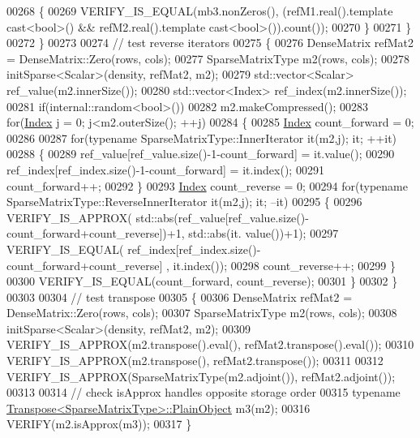 \begin{DoxyCode}
00268       \{
00269         VERIFY\_IS\_EQUAL(mb3.nonZeros(), (refM1.real().template cast<bool>() && refM2.real().template 
      cast<bool>()).count());
00270       \}
00271     \}
00272   \}
00273 
00274   \textcolor{comment}{// test reverse iterators}
00275   \{
00276     DenseMatrix refMat2 = DenseMatrix::Zero(rows, cols);
00277     SparseMatrixType m2(rows, cols);
00278     initSparse<Scalar>(density, refMat2, m2);
00279     std::vector<Scalar> ref\_value(m2.innerSize());
00280     std::vector<Index> ref\_index(m2.innerSize());
00281     \textcolor{keywordflow}{if}(internal::random<bool>())
00282       m2.makeCompressed();
00283     \textcolor{keywordflow}{for}(\hyperlink{namespace_eigen_a62e77e0933482dafde8fe197d9a2cfde}{Index} j = 0; j<m2.outerSize(); ++j)
00284     \{
00285       \hyperlink{namespace_eigen_a62e77e0933482dafde8fe197d9a2cfde}{Index} count\_forward = 0;
00286 
00287       \textcolor{keywordflow}{for}(\textcolor{keyword}{typename} SparseMatrixType::InnerIterator it(m2,j); it; ++it)
00288       \{
00289         ref\_value[ref\_value.size()-1-count\_forward] = it.value();
00290         ref\_index[ref\_index.size()-1-count\_forward] = it.index();
00291         count\_forward++;
00292       \}
00293       \hyperlink{namespace_eigen_a62e77e0933482dafde8fe197d9a2cfde}{Index} count\_reverse = 0;
00294       \textcolor{keywordflow}{for}(\textcolor{keyword}{typename} SparseMatrixType::ReverseInnerIterator it(m2,j); it; --it)
00295       \{
00296         VERIFY\_IS\_APPROX( std::abs(ref\_value[ref\_value.size()-count\_forward+count\_reverse])+1, std::abs(it.
      value())+1);
00297         VERIFY\_IS\_EQUAL( ref\_index[ref\_index.size()-count\_forward+count\_reverse] , it.index());
00298         count\_reverse++;
00299       \}
00300       VERIFY\_IS\_EQUAL(count\_forward, count\_reverse);
00301     \}
00302   \}
00303 
00304   \textcolor{comment}{// test transpose}
00305   \{
00306     DenseMatrix refMat2 = DenseMatrix::Zero(rows, cols);
00307     SparseMatrixType m2(rows, cols);
00308     initSparse<Scalar>(density, refMat2, m2);
00309     VERIFY\_IS\_APPROX(m2.transpose().eval(), refMat2.transpose().eval());
00310     VERIFY\_IS\_APPROX(m2.transpose(), refMat2.transpose());
00311 
00312     VERIFY\_IS\_APPROX(SparseMatrixType(m2.adjoint()), refMat2.adjoint());
00313     
00314     \textcolor{comment}{// check isApprox handles opposite storage order}
00315     \textcolor{keyword}{typename} \hyperlink{group___core___module_class_eigen_1_1_transpose}{Transpose<SparseMatrixType>::PlainObject} m3(m2);
00316     VERIFY(m2.isApprox(m3));
00317   \}

\end{DoxyCode}
